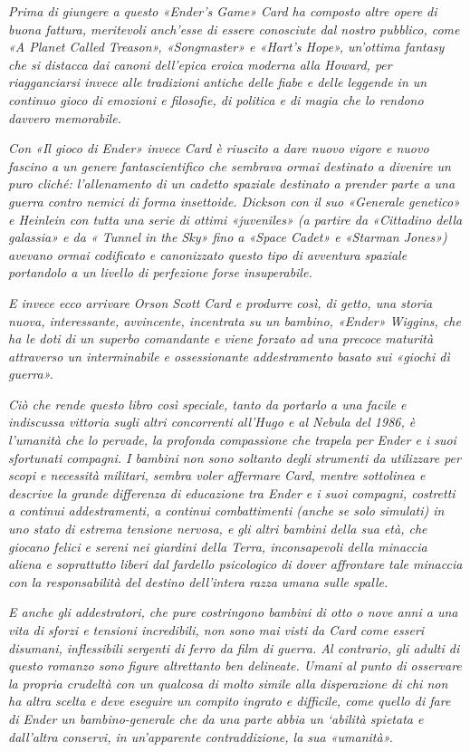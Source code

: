 {\emph{{Prima di giungere a questo «Ender's Game» Card ha composto altre
		opere di buona fattura, meritevoli anch'esse di essere conosciute dal
		nostro pubblico, come «A Planet Called Treason», «Songmaster» e «Hart's
		Hope», un'ottima fantasy che si distacca dai canoni dell'epica eroica
		moderna alla Howard, per riagganciarsi invece alle tradizioni antiche
		delle fiabe e delle leggende in un continuo gioco di emozioni e
		filosofie, di politica e di magia che lo rendono davvero memorabile.}}

\emph{{Con «Il gioco di Ender» invece Card è riuscito a dare nuovo
		vigore e nuovo fascino a un genere fantascientifico che sembrava ormai
		destinato a divenire un puro cliché: l'allenamento di un cadetto
		spaziale destinato a prender parte a una guerra contro nemici di forma
		insettoide. Dickson con il suo «Generale genetico» e Heinlein con tutta
		una serie di ottimi «juveniles» (a partire da «Cittadino della galassia»
		e da « Tunnel in the Sky» fino a «Space Cadet» e «Starman Jones»)
		avevano ormai codificato e canonizzato questo tipo di avventura spaziale
		portandolo a un livello di perfezione forse insuperabile.}}

\emph{{E invece ecco arrivare Orson Scott Card e produrre così, di
		getto, una storia nuova, interessante, avvincente, incentrata su un
		bambino, «Ender» Wiggins, che ha le doti di un superbo comandante e
		viene forzato ad una precoce maturità attraverso un interminabile e
		ossessionante addestramento basato sui «giochi dì guerra».}}

\emph{{Ciò che rende questo libro così speciale, tanto da portarlo a una
		facile e indiscussa vittoria sugli altri concorrenti all'Hugo e al
		Nebula del 1986, è l'umanità che lo pervade, la profonda compassione che
		trapela per Ender e i suoi sfortunati compagni. I bambini non sono
		soltanto degli strumenti da utilizzare per scopi e necessità militari,
		sembra voler affermare Card, mentre sottolinea e descrive la grande
		differenza di educazione tra Ender e i suoi compagni, costretti a
		continui addestramenti, a continui combattimenti (anche se solo
		simulati) in uno stato di estrema tensione nervosa, e gli altri bambini
		della sua età, che giocano felici e sereni nei giardini della Terra,
		inconsapevoli della minaccia aliena e soprattutto liberi dal fardello
		psicologico di dover affrontare tale minaccia con la responsabilità del
		destino dell'intera razza umana sulle spalle.}}

\emph{{E anche gli addestratori, che pure costringono bambini di otto o
		nove anni a una vita di sforzi e tensioni incredibili, non sono mai
		visti da Card come esseri disumani, inflessibili sergenti di ferro da
		film di guerra. Al contrario, gli adulti di questo romanzo sono figure
		altrettanto ben delineate. Umani al punto di osservare la propria
		crudeltà con un qualcosa di molto simile alla disperazione di chi non ha
		altra scelta e deve eseguire un compito ingrato e difficile, come quello
		di fare di Ender un bambino-generale che da una parte abbia un `abilità
		spietata e dall'altra conservi, in un'apparente contraddizione, la sua
		«umanità».}}

}
